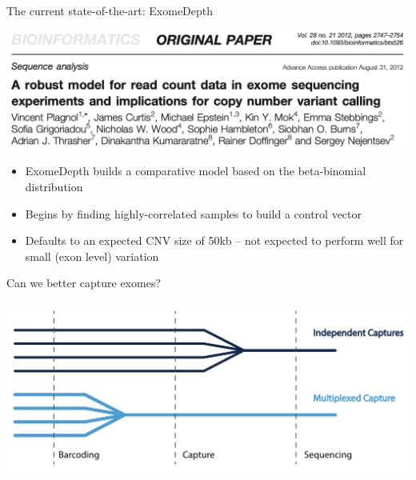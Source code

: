 \documentclass[
  10pt,
  ignorenonframetext,
  m]{beamer}
\begin{document}
\begin{frame}{The current state-of-the-art: ExomeDepth}
\protect\hypertarget{the-current-state-of-the-art-exomedepth}{}

\centering

\includegraphics{images/exomeDepth.png} \raggedright

\begin{itemize}
\item
  ExomeDepth builds a comparative model based on the beta-binomial
  distribution
\item
  Begins by finding highly-correlated samples to build a control vector
\item
  Defaults to an expected CNV size of 50kb -- not expected to perform
  well for small (exon level) variation
\end{itemize}

\end{frame}

\begin{frame}{Can we better capture exomes?}
\protect\hypertarget{can-we-better-capture-exomes}{}

\centering

\includegraphics{images/multiCapture.pdf}

\end{frame}
\end{document}
